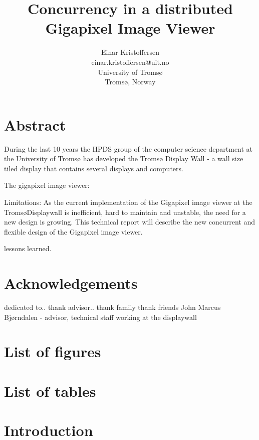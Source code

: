 \documentclass[12pt, a4paper, oneside]{article}
\begin{document}
\title{\bfseries {Concurrency in a distributed \\Gigapixel Image Viewer}}
\author{Einar Kristoffersen \\
einar.kristoffersen@uit.no\\
University of Troms\o\\
Troms\o, Norway}
\date{}

\maketitle

%
\newpage
\tableofcontents
\newpage




\section{Abstract}
During the last 10 years the HPDS group of the computer science department at the University of Tromsø has developed the Tromsø Display Wall - a wall size tiled display that contains several displays and computers.

The gigapixel image viewer:


Limitations:
As the current implementation of the Gigapixel image viewer at the Troms\o Displaywall is inefficient, hard to maintain and unstable, the need for a new design is growing. This technical report will describe the new concurrent and flexible design of the Gigapixel image viewer.

lessons learned.

\section{Acknowledgements}
dedicated to..
thank advisor..
thank family
thank friends
\newline
John Marcus Bjørndalen - advisor, 
technical staff working at the displaywall

\section{List of figures}
\section{List of tables}


\section{Introduction}
\end{document}

